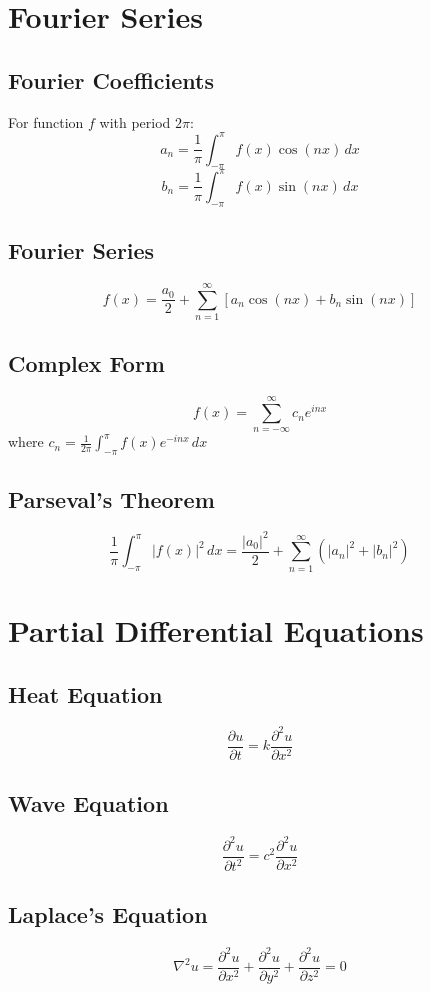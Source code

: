\documentclass[11pt]{article}
\theoremstyle{definition}
\begin{document}
\section{Fourier Series}

\subsection{Fourier Coefficients}
For function $f$ with period $2\pi$:
$$a_n = \frac{1}{\pi} \int_{-\pi}^{\pi} f(x) \cos(nx) \, dx$$
$$b_n = \frac{1}{\pi} \int_{-\pi}^{\pi} f(x) \sin(nx) \, dx$$

\subsection{Fourier Series}
$$f(x) = \frac{a_0}{2} + \sum_{n=1}^{\infty} [a_n \cos(nx) + b_n \sin(nx)]$$

\subsection{Complex Form}
$$f(x) = \sum_{n=-\infty}^{\infty} c_n e^{inx}$$
where $c_n = \frac{1}{2\pi} \int_{-\pi}^{\pi} f(x) e^{-inx} \, dx$

\subsection{Parseval's Theorem}
$$\frac{1}{\pi} \int_{-\pi}^{\pi} |f(x)|^2 \, dx = \frac{|a_0|^2}{2} + \sum_{n=1}^{\infty} (|a_n|^2 + |b_n|^2)$$

\section{Partial Differential Equations}

\subsection{Heat Equation}
$$\frac{\partial u}{\partial t} = k \frac{\partial^2 u}{\partial x^2}$$

\subsection{Wave Equation}
$$\frac{\partial^2 u}{\partial t^2} = c^2 \frac{\partial^2 u}{\partial x^2}$$

\subsection{Laplace's Equation}
$$\nabla^2 u = \frac{\partial^2 u}{\partial x^2} + \frac{\partial^2 u}{\partial y^2} + \frac{\partial^2 u}{\partial z^2} = 0$$
\end{document}
